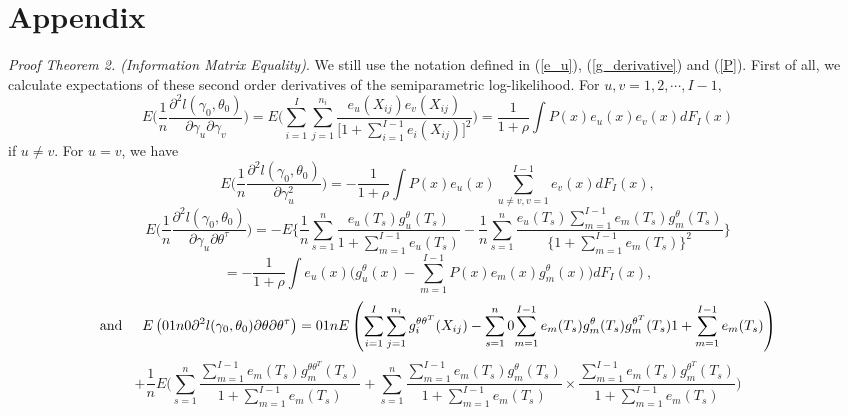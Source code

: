 \documentclass[11pt]{article}
\theoremstyle{plain}
\theoremstyle{definition}
\theoremstyle{remark}
\theoremstyle{definition}
\begin{document}


\section*{Appendix}
\appendix
{\em Proof Theorem 2. (Information Matrix Equality)}. We still use the notation defined in (\ref{e_u}), (\ref{g_derivative}) and (\ref{P}). First of all, we calculate expectations of these second
order derivatives of the semiparametric log-likelihood. For $u, v =1, 2, \cdots, I-1,$
\begin{equation}
E\Big(\frac{1}{n}\frac{\partial^2 l(\gamma_0, \theta_0)}{ \partial \gamma_u
\partial \gamma_v}\Big)=E\Big( \sum_{i=1}^I\sum_{j=1}^{n_i}
\frac{e_u( X_{ij}) e_v(X_{ij})}{\big[1+\sum_{i=1}^{I-1}e_i(X_{ij})\big]^2}\Big)= \frac{1}{1+\rho}
\int P(x)e_u( x) e_v(x) dF_I(x) \label{gammauv}
\end{equation}
\noindent if $u\ne v $. For $u=v$, we have
\begin{equation}
E\Big(\frac{1}{n}\frac{\partial^2l(\gamma_0, \theta_0 )}{\partial
\gamma_u^2} \Big) =-\frac{1}{1+\rho}\int P(x)e_u(x)\sum_{u\ne v,v=1}^{I-1}e_v(x)dF_I(x),\label{gammauu}
\end{equation}
$$E\Big( \frac{1}{n}\frac{\partial^2 l(\gamma_0, \theta_0)}{\partial \gamma_u \partial
\theta^\tau}\Big)=-E\Big\{\frac{1}{n}\sum_{s=1}^n
\frac{e_u(T_s) g_u^\theta(T_s)} {1+\sum_{m=1}^{I-1}e_u(T_s)}
- \frac{1}{n}\sum_{s=1}^n
\frac{e_u(T_s)\sum_{m=1}^{I-1}e_m(T_s)g_m^\theta(T_s)}{\{1+\sum_{m=1}^{I-1}e_m(T_s)\}^2}\Big\}$$
\begin{equation}
 = -\frac{1}{1+\rho}\int e_u(x)\Bigg(g_u^\theta(x)-
\sum_{m=1}^{I-1}P(x)e_m(x)g_m^\theta(x)\Bigg)dF_I(x),\label{gammatheta}
\end{equation}
$$\mbox{and}\hspace{5mm}E \left(\frac{1}{n}\frac{\partial^2 l(\gamma_0,\theta_0)}{\partial \theta
\partial \theta^\tau}\right)=\frac{1}{n}E\left(\sum_{i=1}^I\sum_{j=1}^{n_i}
g_i^{\theta\theta^T}(X_{ij})-\sum_{s=1}^n\frac{\sum_{m=1}^{I-1}
e_m(T_s)g_m^\theta(T_s) g_m^{\theta^T}(T_s)}{1+\sum_{m=1}^{I-1}e_m(T_s)}
\right)$$
$$+\frac{1}{n}E\Bigg(\sum_{s=1}^n\frac{\sum_{m=1}^{I-1}e_m(T_s) g_m^{\theta\theta^T}(T_s)}{1+\sum_{m=1}^{I-1}e_m(T_s)}+\sum_{s=1}^n\frac{\sum_{m=1}^{I-1}
e_m(T_s)g_m^\theta(T_s)}{1+\sum_{m=1}^{I-1}e_m(T_s)}\times \frac{\sum_{m=1}^{I-1}e_m(T_s)g_m^{\theta^T}(T_s)}
{1+\sum_{m=1}^{I-1}e_m(T_s)}\Bigg)$$
\end{document}

